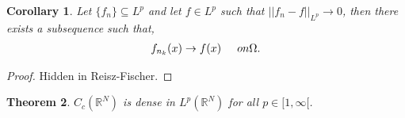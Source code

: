 \documentclass[psamsfonts]{amsart}
\newtheorem{thm}{Theorem}[section]
\newtheorem{cor}[thm]{Corollary}
\theoremstyle{definition}
\theoremstyle{remark}
\newcommand{\R}[0]{\mathbb{R}}
\numberwithin{equation}{section}
\begin{document}
\begin{cor}
	Let \( \{ f_n \} \subseteq L^p \) and let \( f \in L^p \) such that \( || f_n - f ||_{L^p} \rightarrow 0 \), then there exists a subsequence such that, 
	\begin{align*}
		f_{n_k}(x) \rightarrow f(x) \hspace{0.5cm} on \Omega. 
	\end{align*}
\end{cor}

\begin{proof}
	Hidden in Reisz-Fischer.
\end{proof}


\begin{thm}
\(C_c(\R^N) \) is dense in \(L^p(\R^N) \) for all \( p \in [1, \infty [ \).	
\end{thm}
\end{document}
